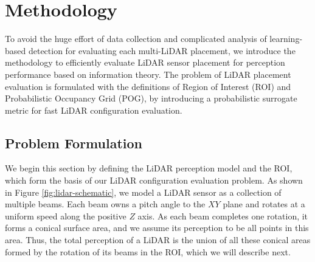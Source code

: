 \documentclass[10pt,twocolumn,letterpaper]{article}
\newcommand{\todo}[1]{\hl{[#1]}}
\begin{document}




\section{Methodology}
\label{method}
To avoid the huge effort of data collection and complicated analysis of learning-based detection  for evaluating each multi-LiDAR placement, we introduce the methodology to efficiently evaluate LiDAR sensor placement for perception performance based on information theory. The problem of LiDAR placement  evaluation is formulated  with the definitions of Region of Interest (ROI) and Probabilistic Occupancy Grid (POG), by introducing a probabilistic surrogate metric for fast LiDAR configuration evaluation.

\subsection{Problem Formulation}
\label{problem-formulation}

We begin this section by defining the LiDAR perception model and the ROI, which form the basis of our LiDAR configuration evaluation problem.
As shown in Figure \ref{fig:lidar-schematic}, we model a LiDAR sensor as a collection of multiple beams. Each beam owns a pitch angle to the $XY$ plane and rotates at a uniform speed along the positive $Z$ axis. As each beam completes one rotation, it forms a conical surface area, and we assume its perception to be all points in this area.  Thus, the total perception of a LiDAR is the union of all these conical areas formed by the rotation of its beams in the ROI, which we will describe next.
\end{document}
